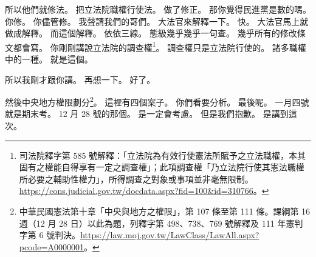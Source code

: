 \hypertarget{c01:cue:1641}{}所以他們就修法。
\hypertarget{c01:cue:1642}{}把立法院職權行使法。
\hypertarget{c01:cue:1643}{}做了修正。
\hypertarget{c01:cue:1644}{}那你覺得民進黨是數的嗎。
\hypertarget{c01:cue:1645}{}你修。
\hypertarget{c01:cue:1646}{}你儘管修。
\hypertarget{c01:cue:1647}{}我聲請我們的哥們。
\hypertarget{c01:cue:1648}{}大法官來解釋一下。
\hypertarget{c01:cue:1649}{}快。
\hypertarget{c01:cue:1650}{}大法官馬上就做成解釋。
\hypertarget{c01:cue:1651}{}而這個解釋。
\hypertarget{c01:cue:1652}{}依依三線。
\hypertarget{c01:cue:1653}{}態級幾乎幾乎一句查。
\hypertarget{c01:cue:1654}{}幾乎所有的修改條文都會寫。
\hypertarget{c01:cue:1655}{}你剛剛講說立法院的調查權\footnote{司法院釋字第 585 號解釋：「立法院為有效行使憲法所賦予之立法職權，本其固有之權能自得享有一定之調查權」；此項調查權「乃立法院行使其憲法職權所必要之輔助性權力」，所得調查之對象或事項並非毫無限制。\url{https://cons.judicial.gov.tw/docdata.aspx?fid=100&id=310766}。}。
\hypertarget{c01:cue:1656}{}調查權只是立法院行使的。
\hypertarget{c01:cue:1657}{}諸多職權中的一種。
\hypertarget{c01:cue:1658}{}就是這個。

\hypertarget{c01:cue:1659}{}所以我剛才跟你講。
\hypertarget{c01:cue:1660}{}再想一下。
\hypertarget{c01:cue:1661}{}好了。

\hypertarget{c01:cue:1662}{}然後中央地方權限劃分\footnote{中華民國憲法第十章「中央與地方之權限」，第 107 條至第 111 條。課綱第 16 週（12 月 28 日）以此為題，列釋字第 498、738、769 號解釋及 111 年憲判字第 6 號判決。\url{https://law.moj.gov.tw/LawClass/LawAll.aspx?pcode=A0000001}。}。
\hypertarget{c01:cue:1663}{}這裡有四個案子。
\hypertarget{c01:cue:1664}{}你們看要分析。
\hypertarget{c01:cue:1665}{}最後呢。
\hypertarget{c01:cue:1666}{}一月四號就是期末考。
\hypertarget{c01:cue:1667}{}12 月 28 號的那個。
\hypertarget{c01:cue:1668}{}是一定會考慮。
\hypertarget{c01:cue:1669}{}但是我們抱歉。
\hypertarget{c01:cue:1670}{}是講到這次。

